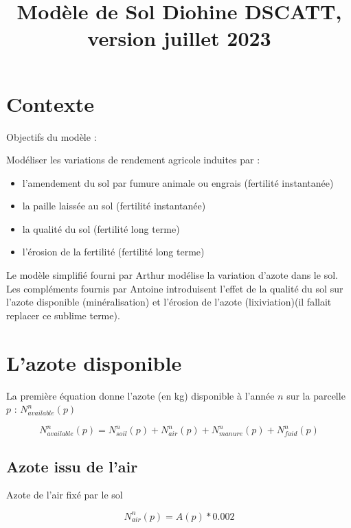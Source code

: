 \documentclass[10pt,a4paper,french]{article} %
\title{Modèle de Sol Diohine DSCATT, version juillet 2023}
\begin{document}
\maketitle


\section{Contexte}

Objectifs du modèle :


Modéliser les variations de rendement agricole induites par : 

\begin{itemize}
	\item l'amendement du sol par fumure animale ou engrais (fertilité instantanée)
	\item la paille laissée au sol (fertilité instantanée)
	\item la qualité du sol (fertilité long terme)
	\item l'érosion de la fertilité (fertilité long terme)
\end{itemize} 

\vspace{0.5cm}
Le modèle simplifié fourni par Arthur modélise la variation d'azote dans le sol. 
Les compléments fournis par Antoine introduisent l'effet de la qualité du sol sur l'azote disponible (minéralisation) et l'érosion de l'azote (lixiviation)(il fallait replacer ce sublime terme). 



\section{L'azote disponible}



La première équation donne l'azote (en kg) disponible à l'année $n$ sur la parcelle $p$ : $N_{available}^{n}(p)$

\begin{equation}
N_{available}^{n}(p)=N_{soil}^{n}(p)+N_{air}^{n}(p)+N_{manure}^{n}(p)+N_{faid}^{n}(p)
\end{equation}


\subsection{Azote issu de l'air}


Azote de l'air fixé par le sol

\begin{equation}
N_{air}^{n}(p) = A(p) * 0.002
\end{equation}
\end{document}
